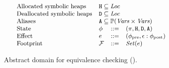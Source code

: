 \begin{figure}[t]
 \centering
%
\[
\!\!\!\!\!\!\!\!\!\!\!\!\!\!\!\!\!\!\!\!\!\!\!\!\!\!\!\!
{  \small
\begin{array}{l l c l}
 \text{Allocated symbolic heaps} & \multicolumn{3}{l}{\mcode{H} \subseteq \mathit{Loc}}
 \\
 \text{Deallocated symbolic heaps} & \multicolumn{3}{l}{\mcode{D} \subseteq \mathit{Loc}}
  \\
  \text{Aliases} & \multicolumn{3}{l}{\mcode{A} \subseteq	\mathbb{P}(\mathit{Vars} \times \mathit{Vars)}}
 \\
 \text{State} & \phi & ::= & \mcode{\metatriple{\pi}{\epsilon}{\ret}{\allocset}{\deallocset}{\aliasset}}
 \\
 \text{Effect} & e & ::= & \mcode{\footprint{\epsilon}{\ret}{\phi_\text{pre}}{\phi_\text{post}}}
 \\
 \text{Footprint} &\mathcal{F} & ::= & \mathit{Set}(e)
\end{array}
}
\]
%
\vspace{-0.5em}
\caption{Abstract domain for equivalence checking (\domainequiv).}
\vspace{0.3em}
\label{fig:equiv}
\end{figure}

